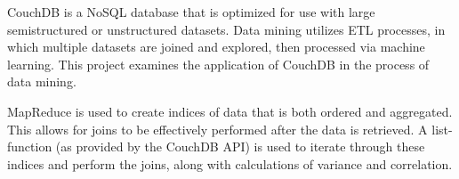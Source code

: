 CouchDB is a NoSQL database that is optimized for use with large semistructured or unstructured datasets. Data mining utilizes ETL processes, in which multiple datasets are joined and explored, then processed via machine learning. This project examines the application of CouchDB in the process of data mining.

MapReduce is used to create indices of data that is both ordered and aggregated. This allows for joins to be effectively performed after the data is retrieved. A list-function (as provided by the CouchDB API) is used to iterate through these indices and perform the joins, along with calculations of variance and correlation.